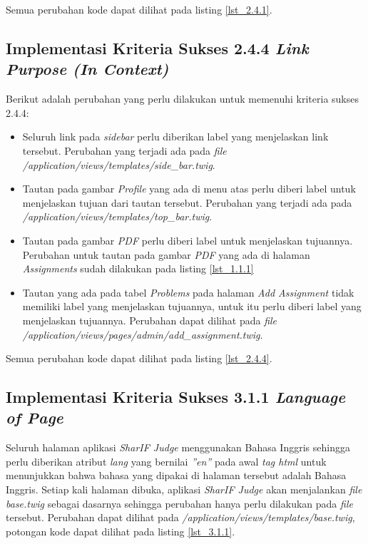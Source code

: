 Semua perubahan kode dapat dilihat pada listing \ref{lst_2.4.1}.

\subsection{Implementasi Kriteria Sukses 2.4.4 \textit{Link Purpose (In Context)}}
\label{subsec:implementasi_A_2.4.4}

Berikut adalah perubahan yang perlu dilakukan untuk memenuhi kriteria sukses 2.4.4:

\begin{itemize}
	\item Seluruh link pada \textit{sidebar} perlu diberikan label yang menjelaskan link tersebut. Perubahan yang terjadi ada pada \textit{file} \textit{/application/views/templates/side\_bar.twig}.

	\item Tautan pada gambar \textit{Profile} yang ada di menu atas perlu diberi label untuk menjelaskan tujuan dari tautan tersebut. Perubahan yang terjadi ada pada \textit{/application/views/templates/top\_bar.twig}.

	\item Tautan pada gambar \textit{PDF} perlu diberi label untuk menjelaskan tujuannya. Perubahan untuk tautan pada gambar \textit{PDF} yang ada di halaman \textit{Assignments} sudah dilakukan pada listing \ref{lst_1.1.1}
	
	\item Tautan yang ada pada tabel \textit{Problems} pada halaman \textit{Add Assignment} tidak memiliki label yang menjelaskan tujuannya, untuk itu perlu diberi label yang menjelaskan tujuannya. Perubahan dapat dilihat pada \textit{file} \textit{/application/views/pages/admin/add\_assignment.twig}.

\end{itemize}

Semua perubahan kode dapat dilihat pada listing \ref{lst_2.4.4}.

\subsection{Implementasi Kriteria Sukses 3.1.1 \textit{Language of Page}}
\label{subsec:implementasi_A_3.1.1}

Seluruh halaman aplikasi \textit{SharIF Judge} menggunakan Bahasa Inggris sehingga perlu diberikan atribut \textit{lang} yang bernilai \textit{''en''} pada awal \textit{tag html} untuk menunjukkan bahwa bahasa yang dipakai di halaman tersebut adalah Bahasa Inggris. Setiap kali halaman dibuka, aplikasi \textit{SharIF Judge} akan menjalankan \textit{file} \textit{base.twig} sebagai dasarnya sehingga perubahan hanya perlu dilakukan pada \textit{file} tersebut. Perubahan dapat dilihat pada \textit{/application/views/templates/base.twig}, potongan kode dapat dilihat pada listing \ref{lst_3.1.1}.

